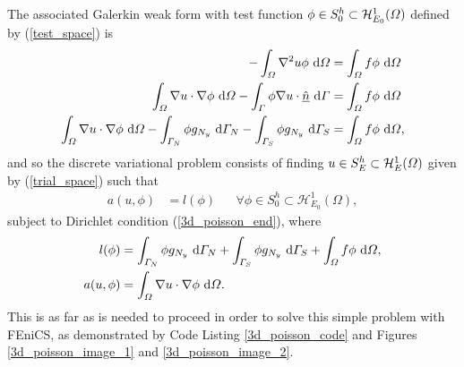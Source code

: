 The associated Galerkin weak form with test function $\phi \in S_0^h \subset \mathcal{H}_{E_0}^1(\varOmega)$ defined by (\ref{test_space}) is
{\footnotesize
\begin{align*}
  -\int_{\varOmega} \nabla^2 u \phi \ \mathrm{d}\varOmega &= \int_{\varOmega} f \phi \ \mathrm{d}\varOmega \\
  \int_{\varOmega} \nabla u \cdot \nabla \phi \ \mathrm{d}\varOmega - \int_{\varGamma} \phi \nabla u \cdot \underline{\hat{n}} \ \mathrm{d}\varGamma &= \int_{\varOmega} f \phi \ \mathrm{d}\varOmega \\
  \int_{\varOmega} \nabla u \cdot \nabla \phi \ \mathrm{d}\varOmega - \int_{\varGamma_N} \phi g_{N_y} \ \mathrm{d}\varGamma_N - \int_{\varGamma_S} \phi g_{N_y} \ \mathrm{d}\varGamma_S &= \int_{\varOmega} f \phi \ \mathrm{d}\varOmega,
\end{align*}}
and so the discrete variational problem consists of finding $u \in S_E^h \subset \mathcal{H}_E^1(\varOmega)$ given by (\ref{trial_space}) such that
\begin{align*}
  a(u,\phi) &= l(\phi) && \forall \phi \in S_0^h \subset \mathcal{H}_{E_0}^1(\Omega),
\end{align*}
subject to Dirichlet condition (\ref{3d_poisson_end}), where
\begin{align*}
  l(\phi) &= \int_{\varGamma_N} \phi g_{N_y} \ \mathrm{d}\varGamma_N + \int_{\varGamma_S} \phi g_{N_y} \ \mathrm{d}\varGamma_S + \int_{\varOmega} f \phi \ \mathrm{d}\varOmega, \\
  a(u,\phi) &= \int_{\varOmega} \nabla u \cdot \nabla \phi \ \mathrm{d}\varOmega.
\end{align*}
This is as far as is needed to proceed in order to solve this simple problem with FEniCS, as demonstrated by Code Listing \ref{3d_poisson_code} and Figures \ref{3d_poisson_image_1} and \ref{3d_poisson_image_2}.

  

